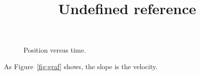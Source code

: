 \documentclass{handout}
\title{Undefined reference}
\begin{document}
\maketitle
\begin{figure}[h]
  \caption{Position versus time.}\label{fig:graph}
\end{figure}
As Figure~\ref{fig:graf} shows, the slope is the velocity.
\end{document}
